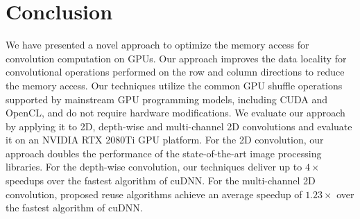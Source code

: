 \section{Conclusion}
We have presented a novel approach to optimize the memory access for convolution computation on GPUs. Our approach improves the data
locality for convolutional operations performed on the row and column directions to reduce the memory access. Our techniques utilize the
common GPU shuffle operations supported by mainstream GPU programming models, including CUDA and OpenCL, and do not require hardware
modifications. We evaluate our approach by applying it to 2D, depth-wise and multi-channel 2D convolutions and evaluate it on an NVIDIA RTX
2080Ti GPU platform. For the 2D convolution, our approach doubles the performance of the state-of-the-art image processing libraries. For
the depth-wise convolution, our techniques deliver up to $4 \times$ speedups over the fastest algorithm of cuDNN. For the multi-channel 2D
convolution, proposed reuse algorithms achieve an average speedup of $1.23\times$ over the fastest algorithm of cuDNN.


